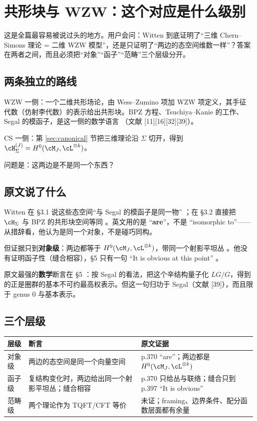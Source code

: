 \section{共形块与 WZW：这个对应是什么级别}
\label{sec:blocks}

这是全篇最容易被说过头的地方。用户会问：Witten 到底证明了“三维 Chern--Simons 理论 = 二维 WZW 模型”，还是只证明了“两边的态空间维数一样”？答案在两者之间，而且必须把“对象”“函子”“范畴”三个层级分开。

\subsection{两条独立的路线}

WZW 一侧：一个二维共形场论，由 Wess--Zumino 项加 WZW 项定义，其手征代数（仿射李代数）的表示给出共形块。BPZ 方程、Tsuchiya--Kanie 的工作、Segal 的模函子，是这一侧的数学语言 （文献 [11][16][32][39]）。

CS 一侧：第 \ref{sec:canonical} 节把三维理论沿 $\Sigma$ 切开，得到 $\cH_\Sigma^{(J)}=H^0(\cM_J,\cL^{\otimes k})$。

问题是：这两边是不是同一个东西？

\subsection{原文说了什么}

Witten 在 §3.1 说这些态空间“与 Segal 的模函子是同一物” ；在 §3.2 直接把 $\cH_\Sigma$ 与 BPZ 的共形块空间等同 。英文用的是 “\textbf{are}”，不是 “isomorphic to”——从措辞看，他认为是同一个对象，不是碰巧同构。

但证据只到\textbf{对象级}：两边都等于 $H^0(\cM_J,\cL^{\otimes k})$，带同一个射影平坦丛 。他没有证明函子性（缝合相容），§5 只有一句 “It is obvious at this point” 。

原文最强的\textbf{数学}断言在 §5 ：按 Segal 的看法，把这个辛结构量子化 $LG/G$，得到的正是圈群的基本不可约最高权表示。但这一句归功于 Segal（文献 [39]），而且限于 genus 0 与基本表示。

\subsection{三个层级}

\begin{center}
\small
\begin{tabular}{@{}p{2.3cm}p{5.2cm}p{6.2cm}@{}}
\toprule
层级 & 断言 & 原文证据 \\
\midrule
对象级 & 两边的态空间是同一个向量空间 & p.370 “are”；两边都是 $H^0(\cM_J,\cL^{\otimes k})$ \\
函子级 & 复结构变化时，两边给出同一个射影平坦丛；缝合相容 & p.370 只给丛与联络；缝合只到 p.397 “It is obvious” \\
范畴级 & 两个理论作为 TQFT/CFT 等价 & 未证；framing、边界条件、配分函数层面都有余量 \\
\bottomrule
\end{tabular}
\end{center}

